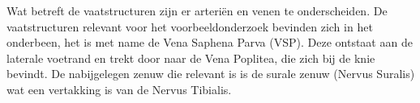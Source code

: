 Wat betreft de vaatstructuren zijn er arteri\"{e}n en venen te onderscheiden. De vaatstructuren relevant voor het voorbeeldonderzoek bevinden zich in het onderbeen, het is met name de Vena Saphena Parva (VSP). Deze ontstaat aan de laterale voetrand en trekt door naar de Vena Poplitea, die zich bij de knie bevindt. De nabijgelegen zenuw die relevant is is de surale zenuw (Nervus Suralis) wat een vertakking is van de Nervus Tibialis.


